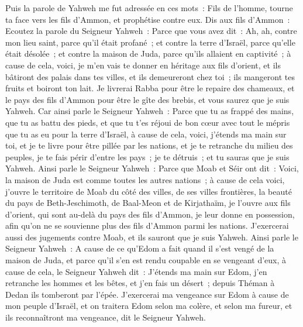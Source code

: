 \begin{multicols}{2}
\VerseOne{}Puis la parole de Yahweh me fut adressée en ces mots~:
Fils de l'homme, tourne ta face vers les fils d'Ammon, et prophétise contre eux.
Dis aux fils d'Ammon~: Ecoutez la parole du Seigneur Yahweh~: Parce que vous avez dit~: Ah, ah, contre mon lieu saint, parce qu'il était profané~; et contre la terre d'Israël, parce qu'elle était désolée~; et contre la maison de Juda, parce qu'ils allaient en captivité~;
à cause de cela, voici, je m'en vais te donner en héritage aux fils d'orient, et ils bâtiront des palais dans tes villes, et ils demeureront chez toi~; ils mangeront tes fruits et boiront ton lait.
Je livrerai Rabba pour être le repaire des chameaux, et le pays des fils d'Ammon pour être le gîte des brebis, et vous saurez que je suis Yahweh.
Car ainsi parle le Seigneur Yahweh~: Parce que tu as frappé des mains, que tu as battu des pieds, et que tu t'es réjoui de bon cœur avec tout le mépris que tu as eu pour la terre d'Israël,
à cause de cela, voici, j'étends ma main sur toi, et je te livre pour être pillée par les nations, et je te retranche du milieu des peuples, je te fais périr d'entre les pays~; je te détruis~; et tu sauras que je suis Yahweh.
Ainsi parle le Seigneur Yahweh~: Parce que Moab et Séir ont dit~: Voici, la maison de Juda est comme toutes les autres nations~;
à cause de cela voici, j'ouvre le territoire de Moab du côté des villes, de ses villes frontières, la beauté du pays de Beth-Jeschimoth, de Baal-Meon et de Kirjathaïm,
je l'ouvre aux fils d'orient, qui sont au-delà du pays des fils d'Ammon, je leur donne en possession, afin qu'on ne se souvienne plus des fils d'Ammon parmi les nations.
J'exercerai aussi des jugements contre Moab, et ils sauront que je suis Yahweh.
Ainsi parle le Seigneur Yahweh~: A cause de ce qu'Edom a fait quand il s'est vengé de la maison de Juda, et parce qu'il s'en est rendu coupable en se vengeant d'eux,
à cause de cela, le Seigneur Yahweh dit~: J'étends ma main sur Edom, j'en retranche les hommes et les bêtes, et j'en fais un désert~; depuis Théman à Dedan ils tomberont par l'épée.
J'exercerai ma vengeance sur Edom à cause de mon peuple d'Israël, et on traitera Edom selon ma colère, et selon ma fureur, et ils reconnaîtront ma vengeance, dit le Seigneur Yahweh.

\end{multicols}
